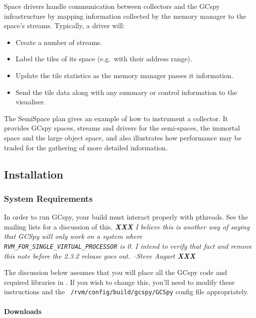 Space drivers handle communication between collectors and the GCspy
infrastructure by mapping information collected by the memory manager
to the space's streams.  Typically, a driver will:

\begin{itemize}
   \item Create a number of streams.
   \item Label the tiles of its space (e.g.\ with their address range).
   \item Update the tile statistics as the memory manager passes it information.
   \item Send the tile data along with any summary or control information to the visualiser. 
\end{itemize}

The SemiSpace plan gives an example of how to instrument a collector.
It provides GCspy spaces, streams and drivers for the semi-spaces, the
immortal space and the large object space, and also illustrates how
performance may be traded for the gathering of more detailed
information.

\subsection{Installation}


\subsubsection{System Requirements}

In order to run GCspy, your \jrvm{} build must interact properly with pthreads.
See the \jrvm{} mailing lists for a discussion of this.  
\textit{\textbf{XXX}
I believe this is another way of saying that GCSpy will only work on a
system where \texttt{RVM\_FOR\_SINGLE\_VIRTUAL\_PROCESSOR} is 0.  I intend
to verify that fact and remove this note before the 2.3.2 release goes
out.  --Steve Augart \textbf{XXX} }

The discussion below assumes that you will place all the
GCspy code and required libraries in \rvmRoot.  If you wish to change
this, you'll need to modify these instructions and the {\tt
  \rvmRoot/rvm/config/build/gcspy/GCSpy} config file appropriately. 

\paragraph{Downloads}

